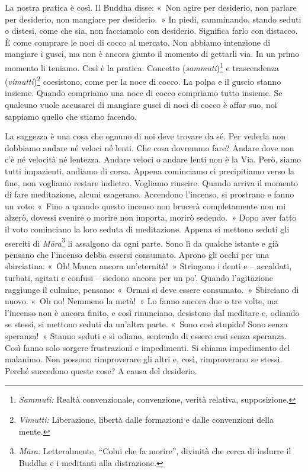 La nostra pratica è così. Il Buddha disse: «~Non agire per desiderio,
non parlare per desiderio, non mangiare per desiderio.~» In piedi,
camminando, stando seduti o distesi, come che sia, non facciamolo con
desiderio. Significa farlo con distacco. È come comprare le noci di
cocco al mercato. Non abbiamo intenzione di mangiare i gusci, ma non è
ancora giunto il momento di gettarli via. In un primo momento li
teniamo. Così è la pratica. Concetto (\emph{sammuti})\footnote{\emph{Sammuti:}
  Realtà convenzionale, convenzione, verità relativa, supposizione.} e
trascendenza (\emph{vimutti})\footnote{\emph{Vimutti:} Liberazione,
  libertà dalle formazioni e dalle convenzioni della mente.} coesistono,
come per la noce di cocco. La polpa e il guscio stanno insieme. Quando
compriamo una noce di cocco compriamo tutto insieme. Se qualcuno vuole
accusarci di mangiare gusci di noci di cocco è affar suo, noi sappiamo
quello che stiamo facendo.

La saggezza è una cosa che ognuno di noi deve trovare da sé. Per vederla
non dobbiamo andare né veloci né lenti. Che cosa dovremmo fare? Andare
dove non c'è né velocità né lentezza. Andare veloci o andare lenti non è
la Via. Però, siamo tutti impazienti, andiamo di corsa. Appena
cominciamo ci precipitiamo verso la fine, non vogliamo restare indietro.
Vogliamo riuscire. Quando arriva il momento di fare meditazione, alcuni
esagerano. Accendono l'incenso, si prostrano e fanno un voto: «~Fino a
quando questo incenso non brucerà completamente non mi alzerò, dovessi
svenire o morire non importa, morirò sedendo.~» Dopo aver fatto il voto
cominciano la loro seduta di meditazione. Appena si mettono seduti gli
eserciti di \emph{Māra}\footnote{\emph{Māra:} Letteralmente, ``Colui che
  fa morire'', divinità che cerca di indurre il Buddha e i meditanti
  alla distrazione.} li assalgono da ogni parte. Sono lì da qualche
istante e già pensano che l'incenso debba essersi consumato. Aprono gli
occhi per una sbirciatina: «~Oh! Manca ancora un'eternità!~» Stringono i
denti e -- accaldati, turbati, agitati e confusi -- siedono ancora per
un po'. Quando l'agitazione raggiunge il culmine, pensano: «~Ormai si
deve essere consumato.~» Sbirciano di nuovo. «~Oh no! Nemmeno la metà!~»
Lo fanno ancora due o tre volte, ma l'incenso non è ancora finito, e
così rinunciano, desistono dal meditare e, odiando se stessi, si mettono
seduti da un'altra parte. «~Sono così stupido! Sono senza speranza!~»
Stanno seduti e si odiano, sentendo di essere casi senza speranza. Così
fanno solo sorgere frustrazioni e impedimenti. Si chiama impedimento del
malanimo. Non possono rimproverare gli altri e, così, rimproverano se
stessi. Perché succedono queste cose? A causa del desiderio.

